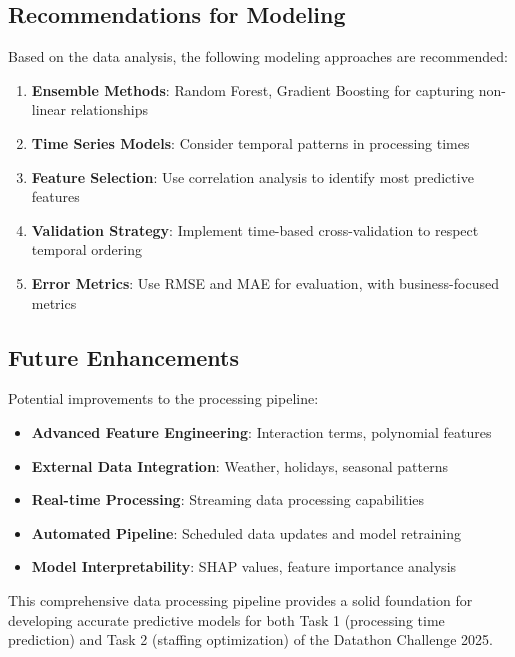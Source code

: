 \documentclass[12pt,a4paper]{article}
\begin{document}
\subsection{Recommendations for Modeling}

Based on the data analysis, the following modeling approaches are recommended:

\begin{enumerate}
    \item \textbf{Ensemble Methods}: Random Forest, Gradient Boosting for capturing non-linear relationships
    \item \textbf{Time Series Models}: Consider temporal patterns in processing times
    \item \textbf{Feature Selection}: Use correlation analysis to identify most predictive features
    \item \textbf{Validation Strategy}: Implement time-based cross-validation to respect temporal ordering
    \item \textbf{Error Metrics}: Use RMSE and MAE for evaluation, with business-focused metrics
\end{enumerate}

\subsection{Future Enhancements}

Potential improvements to the processing pipeline:

\begin{itemize}
    \item \textbf{Advanced Feature Engineering}: Interaction terms, polynomial features
    \item \textbf{External Data Integration}: Weather, holidays, seasonal patterns
    \item \textbf{Real-time Processing}: Streaming data processing capabilities
    \item \textbf{Automated Pipeline}: Scheduled data updates and model retraining
    \item \textbf{Model Interpretability}: SHAP values, feature importance analysis
\end{itemize}

This comprehensive data processing pipeline provides a solid foundation for developing accurate predictive models for both Task 1 (processing time prediction) and Task 2 (staffing optimization) of the Datathon Challenge 2025.
\end{document}
